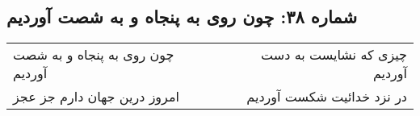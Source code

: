 \begin{center}
\section*{شماره ۳۸: چون روی به پنجاه و به شصت آوردیم}
\label{sec:038}
\begin{longtable}{l p{0.5cm} r}
چون روی به پنجاه و به شصت آوردیم
&&
چیزی که نشایست به دست آوردیم
\\
امروز درین جهان دارم جز عجز
&&
در نزد خدائیت شکست آوردیم
\\
\end{longtable}
\end{center}
